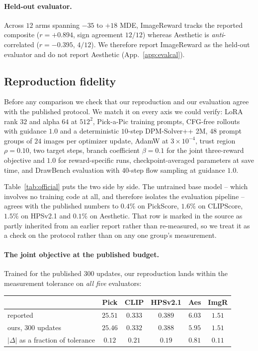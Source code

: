 \paragraph{Held-out evaluator.} Across $12$ arms spanning $-35$ to $+18$ MDE, ImageReward
tracks the reported composite ($r=+0.894$, sign agreement $12/12$) whereas Aesthetic is
\emph{anti}-correlated ($r=-0.395$, $4/12$). We therefore report ImageReward as the
held-out evaluator and do not report Aesthetic (App.~\ref{app:evalcal}).

\subsection{Reproduction fidelity}
\label{sec:exp:repro}

Before any comparison we check that our reproduction and our evaluation agree with the
published protocol. We match it on every axis we could verify: LoRA rank $32$ and alpha
$64$ at $512^2$, Pick-a-Pic training prompts, CFG-free rollouts with guidance $1.0$ and a
deterministic $10$-step DPM-Solver++ 2M, $48$ prompt groups of $24$ images per optimizer
update, AdamW at $3\times10^{-4}$, trust region $\rho=0.10$, two target steps,
branch coefficient $\beta=0.1$ for the joint three-reward objective and $1.0$ for
reward-specific runs, checkpoint-averaged parameters at save time, and DrawBench
evaluation with $40$-step flow sampling at guidance $1.0$.

Table~\ref{tab:official} puts the two side by side. The untrained base model -- which
involves no training code at all, and therefore isolates the evaluation pipeline -- agrees
with the published numbers to $0.4\%$ on PickScore, $1.6\%$ on CLIPScore, $1.5\%$ on
HPSv2.1 and $0.1\%$ on Aesthetic. That row is marked in the source as partly inherited from
an earlier report rather than re-measured, so we treat it as a check on the protocol rather
than on any one group's measurement.

\paragraph{The joint objective at the published budget.} Trained for the published $300$
updates, our reproduction lands within the measurement tolerance on \emph{all five}
evaluators:

\begin{center}
\begin{tabular}{lccccc}
\toprule
& Pick & CLIP & HPSv2.1 & Aes & ImgR\\
\midrule
reported \citep{opsd2026} & $25.51$ & $0.333$ & $0.389$ & $6.03$ & $1.51$\\
ours, $300$ updates       & $25.46$ & $0.332$ & $0.388$ & $5.95$ & $1.51$\\
\midrule
$|\Delta|$ as a fraction of tolerance & $0.12$ & $0.21$ & $0.19$ & $0.81$ & $0.11$\\
\bottomrule
\end{tabular}
\end{center}

